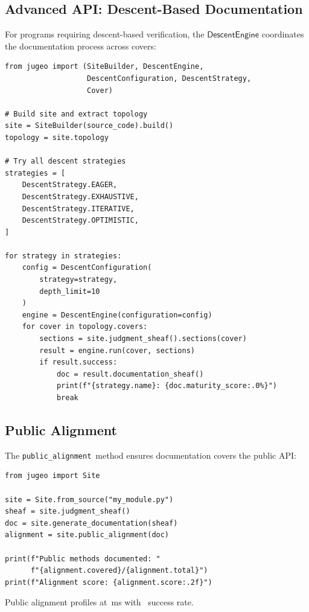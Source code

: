 \documentclass[11pt]{article}
\newcommand{\PublicAlignAPI}{\texttt{public\_alignment}}
\begin{document}
\subsection{Advanced API: Descent-Based Documentation}

For programs requiring descent-based verification, the
$\mathsf{DescentEngine}$ coordinates the documentation process
across covers:

\begin{lstlisting}[style=jugeo-python]
from jugeo import (SiteBuilder, DescentEngine,
                   DescentConfiguration, DescentStrategy,
                   Cover)

# Build site and extract topology
site = SiteBuilder(source_code).build()
topology = site.topology

# Try all descent strategies
strategies = [
    DescentStrategy.EAGER,
    DescentStrategy.EXHAUSTIVE,
    DescentStrategy.ITERATIVE,
    DescentStrategy.OPTIMISTIC,
]

for strategy in strategies:
    config = DescentConfiguration(
        strategy=strategy,
        depth_limit=10
    )
    engine = DescentEngine(configuration=config)
    for cover in topology.covers:
        sections = site.judgment_sheaf().sections(cover)
        result = engine.run(cover, sections)
        if result.success:
            doc = result.documentation_sheaf()
            print(f"{strategy.name}: {doc.maturity_score:.0%}")
            break
\end{lstlisting}

\subsection{Public Alignment}
The \PublicAlignAPI\ method ensures documentation covers the public API:

\begin{lstlisting}[style=jugeo-python]
from jugeo import Site

site = Site.from_source("my_module.py")
sheaf = site.judgment_sheaf()
doc = site.generate_documentation(sheaf)
alignment = site.public_alignment(doc)

print(f"Public methods documented: "
      f"{alignment.covered}/{alignment.total}")
print(f"Alignment score: {alignment.score:.2f}")
\end{lstlisting}

Public alignment profiles at \compProfPublicAlignmentMeanMs\,ms with
\compProfPublicAlignmentRate\ success rate.
\end{document}
